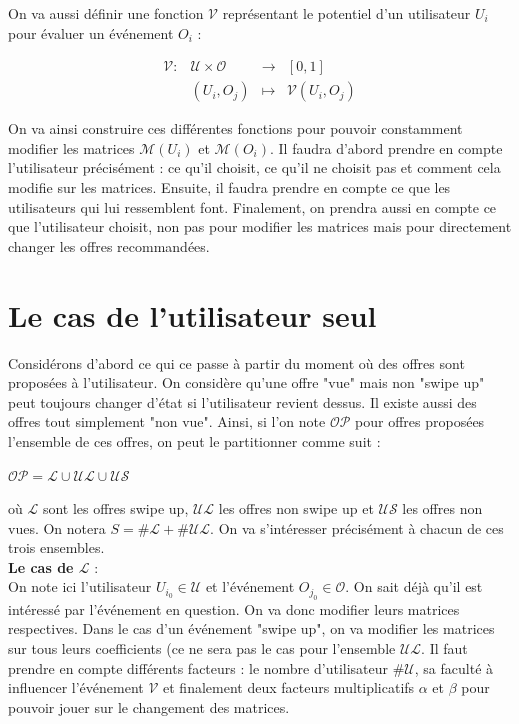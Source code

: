 \documentclass[11pt, oneside]{article}
\begin{document}
On va aussi définir une fonction $\mathcal{V}$ représentant le potentiel d'un utilisateur $U_i$ pour évaluer un événement $O_i$ :
\begin{center}
\[
\begin{array}{l|rcl}
\mathcal{V} : & \mathcal{U} \times \mathcal{O} & \longrightarrow & [0,1] \\
    & (U_i,O_j) & \longmapsto & \mathcal{V} (U_i,O_j) \end{array}
\]

\end{center}

On va ainsi construire ces différentes fonctions pour pouvoir constamment modifier les matrices  $\mathcal{M} (U_i)$ et $\mathcal{M} (O_i)$. Il faudra d'abord prendre en compte l'utilisateur précisément : ce qu'il choisit, ce qu'il ne choisit pas et comment cela modifie sur les matrices. Ensuite, il faudra prendre en compte ce que les utilisateurs qui lui ressemblent font. Finalement, on prendra aussi en compte ce que l'utilisateur choisit, non pas pour modifier les matrices mais pour directement changer les offres recommandées.

\section{Le cas de l'utilisateur seul}

Considérons d'abord ce qui ce passe à partir du moment où des offres sont proposées à l'utilisateur. On considère qu'une offre "vue" mais non "swipe up" peut toujours changer d'état si l'utilisateur revient dessus. Il existe aussi des offres tout simplement "non vue". Ainsi, si l'on note $\mathcal{OP}$ pour offres proposées l'ensemble de ces offres, on peut le partitionner comme suit :

\begin{center}

$\mathcal{OP} = \mathcal{L} \cup \mathcal{UL} \cup \mathcal{US}$

\end{center}

où $\mathcal{L}$ sont les offres swipe up, $\mathcal{UL}$ les offres non swipe up et $\mathcal{US}$ les offres non vues. On notera $S = \#\mathcal{L} + \#\mathcal{UL}$. On va s'intéresser précisément à chacun de ces trois ensembles. \\

\textbf{Le cas de $\mathcal{L}$} : \\

On note ici l'utilisateur $U_{i_0} \in \mathcal{U}$ et l'événement $O_{j_0} \in \mathcal{O}$. On sait déjà qu'il est intéressé par l'événement en question. On va donc modifier leurs matrices respectives. Dans le cas d'un événement "swipe up", on va modifier les matrices sur tous leurs coefficients (ce ne sera pas le cas pour l'ensemble $\mathcal{UL}$. Il faut prendre en compte différents facteurs : le nombre d'utilisateur $\#\mathcal{U}$, sa faculté à influencer l'événement $\mathcal{V}$ et finalement deux facteurs multiplicatifs $\alpha$ et $\beta$ pour pouvoir jouer sur le changement des matrices. \\
\end{document}
